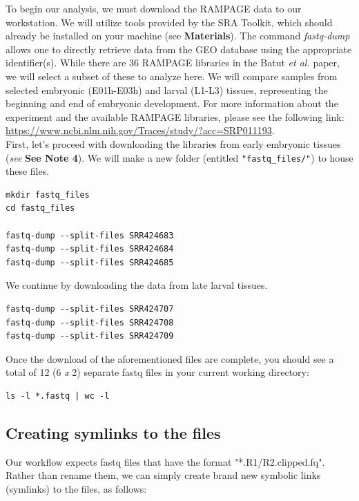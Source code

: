 \documentclass[runningheads,a4paper]{llncs}
\begin{document}
\begin{linenumbers}
To begin our analysis, we must download the RAMPAGE data to our workstation. 
We will utilize tools provided by the SRA Toolkit, which should already be installed on your machine (see \textbf{Materials}).
The command \textit{fastq-dump} allows one to directly retrieve data from the GEO database using the appropriate identifier(s).
While there are 36 RAMPAGE libraries in the Batut \textit{et al.} paper, we will select a subset of these to analyze here.
We will compare samples from selected embryonic (E01h-E03h) and larval (L1-L3) tissues, representing the beginning and end of embryonic development.
For more information about the experiment and the available RAMPAGE libraries, please see the following link: \url{https://www.ncbi.nlm.nih.gov/Traces/study/?acc=SRP011193}.\\

\noindent
First, let's proceed with downloading the libraries from early embryonic tissues (\textit{see} \textbf{See Note 4}).
We will make a new folder (entitled \texttt{"fastq\_files/"}) to house these files.

\noindent
\begin{verbatim}
mkdir fastq_files
cd fastq_files

fastq-dump --split-files SRR424683
fastq-dump --split-files SRR424684
fastq-dump --split-files SRR424685
\end{verbatim}

\noindent
We continue by downloading the data from late larval tissues.

\begin{verbatim}
fastq-dump --split-files SRR424707
fastq-dump --split-files SRR424708
fastq-dump --split-files SRR424709
\end{verbatim}

\noindent
Once the download of the aforementioned files are complete, you should see a total of 12 (6 \textit{x} 2) separate fastq files in your current working directory:

\noindent
\begin{verbatim}
ls -l *.fastq | wc -l
\end{verbatim}

\subsection{Creating symlinks to the files}
Our workflow expects fastq files that have the format "*.R1/R2.clipped.fq". 
Rather than rename them, we can simply create brand new symbolic links (symlinks) to the files, as follows:


\end{linenumbers}
\end{document}
